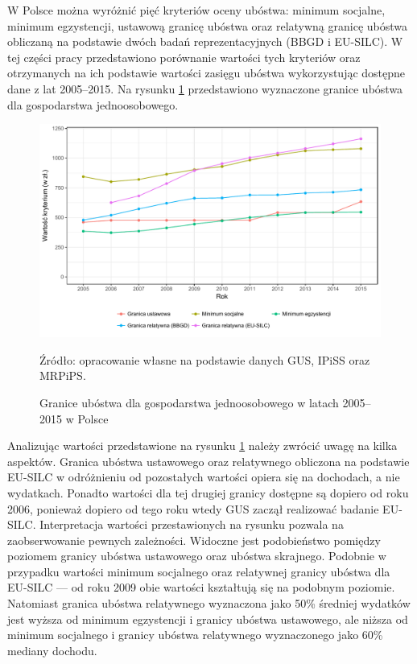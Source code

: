 W Polsce można wyróżnić pięć kryteriów oceny ubóstwa: minimum socjalne, minimum egzystencji, ustawową granicę ubóstwa oraz relatywną granicę ubóstwa obliczaną na podstawie dwóch badań reprezentacyjnych (BBGD i EU-SILC). W tej części pracy przedstawiono porównanie wartości tych kryteriów oraz otrzymanych na ich podstawie wartości zasięgu ubóstwa wykorzystując dostępne dane z lat 2005--2015. Na rysunku \ref{fig:gr_1os} przedstawiono wyznaczone granice ubóstwa dla gospodarstwa jednoosobowego.

\begin{figure}[ht]
\includegraphics[width=\textwidth]{01_wykresy/gr_1os-1.pdf}
\caption{Granice ubóstwa dla gospodarstwa jednoosobowego w latach 2005--2015 w Polsce}
\small{Źródło: opracowanie własne na podstawie danych GUS, IPiSS oraz MRPiPS.}
\label{fig:gr_1os}
\end{figure}

Analizując wartości przedstawione na rysunku \ref{fig:gr_1os} należy zwrócić uwagę na kilka aspektów. Granica ubóstwa ustawowego oraz relatywnego obliczona na podstawie EU-SILC w odróżnieniu od pozostałych wartości opiera się na dochodach, a nie wydatkach. Ponadto wartości dla tej drugiej granicy dostępne są dopiero od roku 2006, ponieważ dopiero od tego roku wtedy GUS zaczął realizować badanie EU-SILC. Interpretacja wartości przestawionych na rysunku pozwala na zaobserwowanie pewnych zależności. Widoczne jest podobieństwo pomiędzy poziomem granicy ubóstwa ustawowego oraz ubóstwa skrajnego. Podobnie w przypadku wartości minimum socjalnego oraz relatywnej granicy ubóstwa dla EU-SILC --- od roku 2009 obie wartości kształtują się na podobnym poziomie. Natomiast granica ubóstwa relatywnego wyznaczona jako 50\% średniej wydatków jest wyższa od minimum egzystencji i granicy ubóstwa ustawowego, ale niższa od minimum socjalnego i granicy ubóstwa relatywnego wyznaczonego jako 60\% mediany dochodu.

